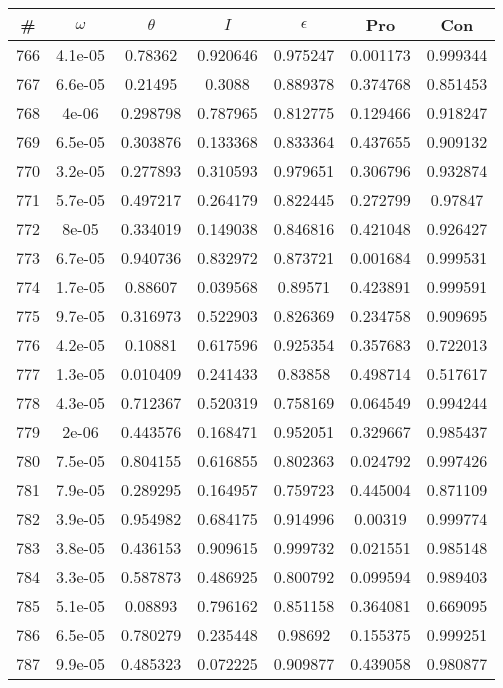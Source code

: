 \newpage
\begin{table}
\begin{tabular}{c|c|c|c|c|c|c}
\# & $\omega$ & $\theta$ & $I$ & $\epsilon$ & Pro & Con\\
\hline
766 & 4.1e-05 & 0.78362 & 0.920646 & 0.975247 & 0.001173 & 0.999344\\
767 & 6.6e-05 & 0.21495 & 0.3088 & 0.889378 & 0.374768 & 0.851453\\
768 & 4e-06 & 0.298798 & 0.787965 & 0.812775 & 0.129466 & 0.918247\\
769 & 6.5e-05 & 0.303876 & 0.133368 & 0.833364 & 0.437655 & 0.909132\\
770 & 3.2e-05 & 0.277893 & 0.310593 & 0.979651 & 0.306796 & 0.932874\\
771 & 5.7e-05 & 0.497217 & 0.264179 & 0.822445 & 0.272799 & 0.97847\\
772 & 8e-05 & 0.334019 & 0.149038 & 0.846816 & 0.421048 & 0.926427\\
773 & 6.7e-05 & 0.940736 & 0.832972 & 0.873721 & 0.001684 & 0.999531\\
774 & 1.7e-05 & 0.88607 & 0.039568 & 0.89571 & 0.423891 & 0.999591\\
775 & 9.7e-05 & 0.316973 & 0.522903 & 0.826369 & 0.234758 & 0.909695\\
776 & 4.2e-05 & 0.10881 & 0.617596 & 0.925354 & 0.357683 & 0.722013\\
777 & 1.3e-05 & 0.010409 & 0.241433 & 0.83858 & 0.498714 & 0.517617\\
778 & 4.3e-05 & 0.712367 & 0.520319 & 0.758169 & 0.064549 & 0.994244\\
779 & 2e-06 & 0.443576 & 0.168471 & 0.952051 & 0.329667 & 0.985437\\
780 & 7.5e-05 & 0.804155 & 0.616855 & 0.802363 & 0.024792 & 0.997426\\
781 & 7.9e-05 & 0.289295 & 0.164957 & 0.759723 & 0.445004 & 0.871109\\
782 & 3.9e-05 & 0.954982 & 0.684175 & 0.914996 & 0.00319 & 0.999774\\
783 & 3.8e-05 & 0.436153 & 0.909615 & 0.999732 & 0.021551 & 0.985148\\
784 & 3.3e-05 & 0.587873 & 0.486925 & 0.800792 & 0.099594 & 0.989403\\
785 & 5.1e-05 & 0.08893 & 0.796162 & 0.851158 & 0.364081 & 0.669095\\
786 & 6.5e-05 & 0.780279 & 0.235448 & 0.98692 & 0.155375 & 0.999251\\
787 & 9.9e-05 & 0.485323 & 0.072225 & 0.909877 & 0.439058 & 0.980877\\

\end{tabular}
\end{table}

